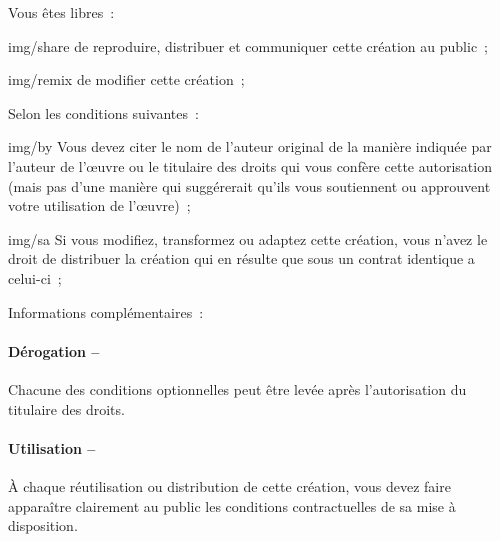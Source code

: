 {  %
  \begin{lblock}{Vous êtes libres~:}

    \begin{pictonote}{img/share}
      de reproduire, distribuer et communiquer cette création au
      public~;
    \end{pictonote}

    \begin{pictonote}{img/remix}
      de modifier cette création~;
    \end{pictonote}

  \end{lblock}
  \begin{lblock}{Selon les conditions suivantes~:}

    \begin{pictonote}{img/by}
       Vous devez citer le nom de l'auteur
      original de la manière indiquée par l'auteur de l'œuvre ou le
      titulaire des droits qui vous confère cette autorisation (mais pas
      d'une manière qui suggérerait qu'ils vous soutiennent ou
      approuvent votre utilisation de l'œuvre)~;
    \end{pictonote}

    \begin{pictonote}{img/sa}
       Si
      vous modifiez, transformez ou adaptez cette création, vous n'avez
      le droit de distribuer la création qui en résulte que sous un
      contrat identique a celui-ci~;
    \end{pictonote}

  \end{lblock}
  \begin{lblock}{Informations complémentaires~:}

    \hspace{0.4cm}
    \parbox{\textwidth-.8cm}{
      \paragraph{Dérogation --}
      Chacune des conditions optionnelles peut être levée après
      l'autorisation du titulaire des droits.

      \paragraph{Utilisation --}
      À chaque réutilisation ou distribution de cette création, vous
      devez faire apparaître clairement au public les conditions
      contractuelles de sa mise à disposition.

}
\end{lblock}}

